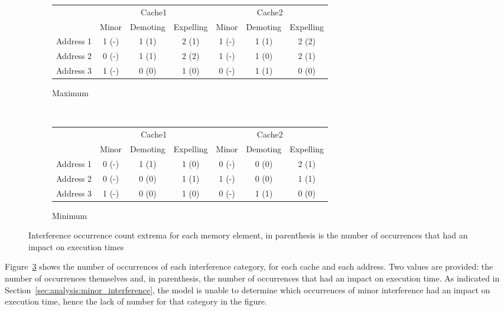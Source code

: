 \begin{example}
\begin{figure}[hbt!]
\begin{center}
\begin{subfigure}[t]{\textwidth}
\centering
\begin{tabular}{|c|c|c|c|c|c|c|}
\cline{2-7}
\multicolumn{1}{c|}{} &
\multicolumn{3}{c|}{Cache1} &
\multicolumn{3}{c|}{Cache2} \\
\multicolumn{1}{c|}{} & Minor & Demoting & Expelling & Minor & Demoting &
Expelling\\
\hline
Address 1 & 1 (-) & 1 (1) & 2 (1) & 1 (-) & 1 (1) & 2 (2)\\
\hline
Address 2 & 0 (-) & 1 (1) & 2 (2) & 1 (-) & 1 (0) & 2 (1)\\
\hline
Address 3 & 1 (-) & 0 (0) & 1 (0) & 0 (-) & 1 (1) & 0 (0)\\
\hline
\end{tabular}
\caption{Maximum}
\label{fig:analyzing:maximum_interference}
\end{subfigure}
\\\vspace{1em}
\begin{subfigure}[t]{\textwidth}
\centering
\begin{tabular}{|c|c|c|c|c|c|c|}
\cline{2-7}
\multicolumn{1}{c|}{} &
\multicolumn{3}{c|}{Cache1} &
\multicolumn{3}{c|}{Cache2} \\
\multicolumn{1}{c|}{} & Minor & Demoting & Expelling & Minor & Demoting &
Expelling\\
\hline
Address 1 & 0 (-) & 1 (1) & 1 (0) & 0 (-) & 0 (0) & 2 (1)\\
\hline
Address 2 & 0 (-) & 0 (0) & 1 (1) & 1 (-) & 0 (0) & 1 (1)\\
\hline
Address 3 & 1 (-) & 0 (0) & 1 (0) & 0 (-) & 1 (1) & 0 (0)\\
\hline
\end{tabular}
\caption{Minimum}
\label{fig:analyzing:minimum_interference}
\end{subfigure}
\end{center}
\caption{Interference occurrence count extrema for each memory element, in
parenthesis is the number of occurrences that had an impact on execution times}
\label{fig:analyzing:interference_extrema}
\end{figure}

Figure~\ref{fig:analyzing:interference_extrema} shows the number of occurrences
of each interference category, for each cache and each address. Two values are
provided: the number of occurrences themselves and, in parenthesis, the number
of occurrences that had an impact on execution time. As indicated in
Section~\ref{sec:analysis:minor_interference}, the model is unable
to determine which occurrences of minor interference had an impact on execution
time, hence the lack of number for that category in the figure.


\end{example}
